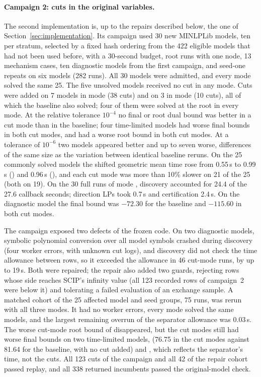 \paragraph{Campaign 2: cuts in the original variables.}
The second implementation is, up to the repairs described below, the one of
Section~\ref{sec:implementation}. Its campaign used 30 new MINLPLib models, ten
per stratum, selected by a fixed hash ordering from the 422 eligible models
that had not been used before, with a 30-second budget, root runs with one
node, 13 mechanism cases, ten diagnostic models from the first campaign, and
seed-one repeats on six models (282 runs). All 30 models were admitted, and
every mode solved the same 25. The five unsolved models received no cut in any
mode. Cuts were added on 7 models in mode  (38 cuts) and on 3 in mode
 (10 cuts), all of which the baseline also solved; four of them were
solved at the root in every mode. At the relative tolerance $10^{-4}$ no final or
root dual bound was better in a cut mode than in the baseline; four
time-limited models had worse final bounds in both cut modes, and
 had a worse root bound in both cut modes. At a
tolerance of $10^{-6}$ two models appeared better and up to seven worse,
differences of the same size as the variation between identical baseline
reruns. On the 25 commonly solved models the shifted geometric mean time rose
from 0.55\,s to 0.99\,s () and 0.96\,s (), and each cut mode
was more than 10\% slower on 21 of the 25 (both on 19). On the 30 full runs of mode
, discovery accounted for 24.4 of the 27.6 callback seconds; direction
LPs took 0.7\,s and certification 2.4\,s. On the diagnostic model 
the final bound was $-72.30$ for the baseline and $-115.60$ in both cut modes.

The campaign exposed two defects of the frozen code. On two diagnostic models,
symbolic polynomial conversion over all model symbols crashed during discovery
(four worker errors, with unknown cut logs), and discovery did not check the
time allowance between rows, so it exceeded the allowance in 46 cut-mode runs,
by up to 19\,s. Both were repaired; the repair also added two guards, rejecting
rows whose side reaches SCIP's infinity value (all 123 recorded rows of
campaign~2 were below it) and tolerating a failed evaluation of an exchange
sample. A matched cohort of the 25 affected model and seed groups, 75 runs, was
rerun with all three modes. It had no worker errors, every mode solved the
same models, and the largest remaining overrun of the separator allowance was
0.03\,s. The worse cut-mode root bound of 
disappeared, but the cut modes still had worse final bounds on two
time-limited models,  (76.75 in the cut modes against 81.64 for the
baseline, with no cut added) and , which reflects the separator's time, not the cuts.
All 123 cuts of the campaign and all 42 of the repair cohort passed replay, and
all 338 returned incumbents passed the original-model check.
